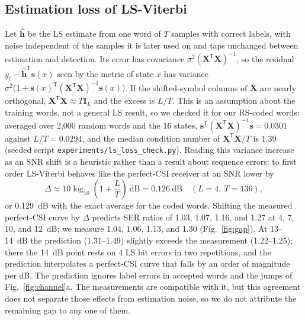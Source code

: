 \documentclass[journal]{IEEEtran}
\begin{document}
\subsection{Estimation loss of LS-Viterbi}
Let $\hat{\mathbf h}$ be the LS estimate from one word of $T$ samples with correct labels, with noise independent of the samples it is later used on and taps unchanged between estimation and detection. Its error has covariance $\sigma^2(\mathbf X^{\mathsf T}\mathbf X)^{-1}$, so the residual $y_t-\hat{\mathbf h}^{\mathsf T}\mathbf s(x)$ seen by the metric of state $x$ has variance $\sigma^2\big(1+\mathbf s(x)^{\mathsf T}(\mathbf X^{\mathsf T}\mathbf X)^{-1}\mathbf s(x)\big)$. If the shifted-symbol columns of $\mathbf X$ are nearly orthogonal, $\mathbf X^{\mathsf T}\mathbf X\approx T\mathbf I_L$ and the excess is $L/T$. This is an assumption about the training words, not a general LS result, so we checked it for our RS-coded words: averaged over 2,000 random words and the 16 states, $\mathbf s^{\mathsf T}(\mathbf X^{\mathsf T}\mathbf X)^{-1}\mathbf s=0.0301$ against $L/T=0.0294$, and the median condition number of $\mathbf X^{\mathsf T}\mathbf X/T$ is 1.39 (seeded script \texttt{experiments/ls\_loss\_check.py}). Reading this variance increase as an SNR shift is a heuristic rather than a result about sequence errors: to first order LS-Viterbi behaves like the perfect-CSI receiver at an SNR lower by
\begin{equation}\label{eq:loss}
\Delta\approx10\log_{10}\!\left(1+\frac{L}{T}\right)\ \text{dB}=0.126\ \text{dB}\quad(L=4,\ T=136),
\end{equation}
or 0.129~dB with the exact average for the coded words. Shifting the measured perfect-CSI curve by $\Delta$ predicts SER ratios of 1.03, 1.07, 1.16, and 1.27 at 4, 7, 10, and 12~dB; we measure 1.04, 1.06, 1.13, and 1.30 (Fig.~\ref{fig:gap}). At 13--14~dB the prediction (1.31--1.49) slightly exceeds the measurement (1.22--1.25); there the 14~dB point rests on 4 LS bit errors in two repetitions, and the prediction interpolates a perfect-CSI curve that falls by an order of magnitude per dB. The prediction ignores label errors in accepted words and the jumps of Fig.~\ref{fig:channel}a. The measurements are compatible with it, but this agreement does not separate those effects from estimation noise, so we do not attribute the remaining gap to any one of them.
\end{document}
